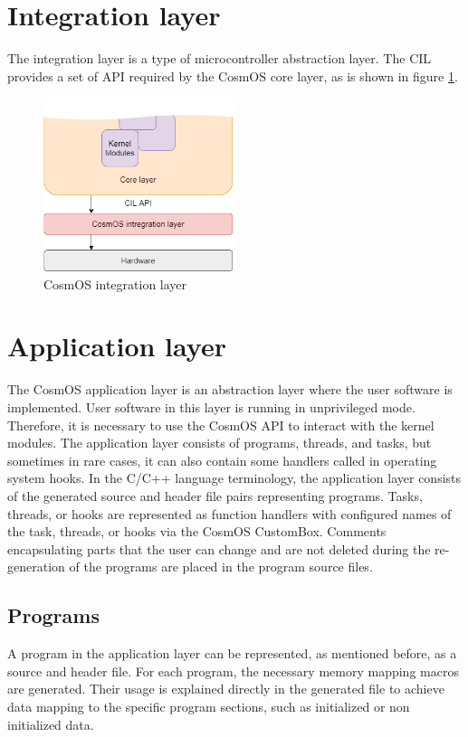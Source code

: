 \section{Integration layer}
The integration layer is a type of microcontroller abstraction layer. The \ac{CIL} provides a set of \ac{API} required by the CosmOS core layer, as is shown in figure \ref{fig:CIL}.

\begin{figure}[H]
\begin{center}
\includegraphics[width=0.5\textwidth]{images/cosmos_integration.png}
\caption{CosmOS integration layer}
\label{fig:CIL}
\end{center}
\end{figure}


\section{Application layer}
The CosmOS application layer is an abstraction layer where the user software is implemented. User software in this layer is running in unprivileged mode. Therefore, it is necessary to use the CosmOS API to interact with the kernel modules. The application layer consists of programs,  threads, and tasks, but sometimes in rare cases, it can also contain some handlers called in operating system hooks. In the C/C++ language terminology, the application layer consists of the generated source and header file pairs representing programs. Tasks, threads, or hooks are represented as function handlers with configured names of the task, threads, or hooks via the CosmOS CustomBox. Comments encapsulating parts that the user can change and are not deleted during the re-generation of the programs are placed in the program source files.

\subsection{Programs}
A program in the application layer can be represented, as mentioned before, as a source and header file. For each program, the necessary memory mapping macros are generated. Their usage is explained directly in the generated file to achieve data mapping to the specific program sections, such as initialized or non initialized data.
